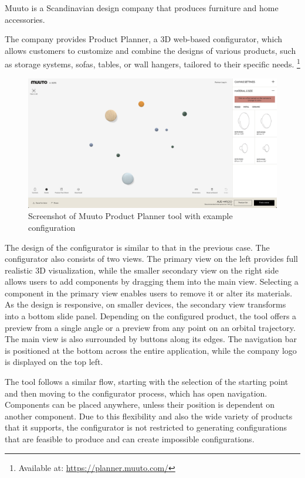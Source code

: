 Muuto is a Scandinavian design company that produces furniture and home accessories. \cite{Muuto}

The company provides Product Planner, a 3D web-based configurator, which allows customers to customize and combine the designs of various products, such as storage systems, sofas, tables, or wall hangers, tailored to their specific needs. \footnote{Available at: \url{https://planner.muuto.com/}}

\begin{figure}[h]
\centering
\includegraphics[width=\textwidth]{images/analysis_muuto-product-planner.png}
\caption{Screenshot of Muuto Product Planner tool with example configuration}
\end{figure}

The design of the configurator is similar to that in the previous case. The configurator also consists of two views. The primary view on the left provides full realistic 3D visualization, while the smaller secondary view on the right side allows users to add components by dragging them into the main view. Selecting a component in the primary view enables users to remove it or alter its materials. As the design is responsive, on smaller devices, the secondary view transforms into a bottom slide panel. Depending on the configured product, the tool offers a preview from a single angle or a preview from any point on an orbital trajectory. The main view is also surrounded by buttons along its edges. The navigation bar is positioned at the bottom across the entire application, while the company logo is displayed on the top left.

The tool follows a similar flow, starting with the selection of the starting point and then moving to the configurator process, which has open navigation. Components can be placed anywhere, unless their position is dependent on another component. Due to this flexibility and also the wide variety of products that it supports, the configurator is not restricted to generating configurations that are feasible to produce and can create impossible configurations.

